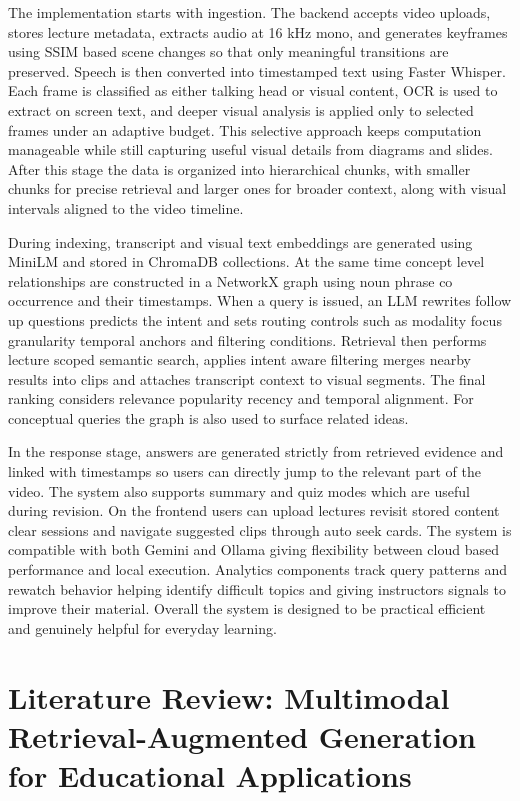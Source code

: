 \documentclass[conference]{IEEEtran}
\begin{document}
    The implementation starts with ingestion. The backend accepts video uploads, stores lecture metadata, extracts audio at 16 kHz mono, and generates keyframes using SSIM based scene changes so that only meaningful transitions are preserved. Speech is then converted into timestamped text using Faster Whisper. Each frame is classified as either talking head or visual content, OCR is used to extract on screen text, and deeper visual analysis is applied only to selected frames under an adaptive budget. This selective approach keeps computation manageable while still capturing useful visual details from diagrams and slides. After this stage the data is organized into hierarchical chunks, with smaller chunks for precise retrieval and larger ones for broader context, along with visual intervals aligned to the video timeline.

    During indexing, transcript and visual text embeddings are generated using MiniLM and stored in ChromaDB collections. At the same time concept level relationships are constructed in a NetworkX graph using noun phrase co occurrence and their timestamps. When a query is issued, an LLM rewrites follow up questions predicts the intent and sets routing controls such as modality focus granularity temporal anchors and filtering conditions. Retrieval then performs lecture scoped semantic search, applies intent aware filtering merges nearby results into clips and attaches transcript context to visual segments. The final ranking considers relevance popularity recency and temporal alignment. For conceptual queries the graph is also used to surface related ideas.

    In the response stage, answers are generated strictly from retrieved evidence and linked with timestamps so users can directly jump to the relevant part of the video. The system also supports summary and quiz modes which are useful during revision. On the frontend users can upload lectures revisit stored content clear sessions and navigate suggested clips through auto seek cards. The system is compatible with both Gemini and Ollama giving flexibility between cloud based performance and local execution. Analytics components track query patterns and rewatch behavior helping identify difficult topics and giving instructors signals to improve their material. Overall the system is designed to be practical efficient and genuinely helpful for everyday learning.



    \section{Literature Review: Multimodal Retrieval-Augmented Generation for Educational Applications}
\end{document}
